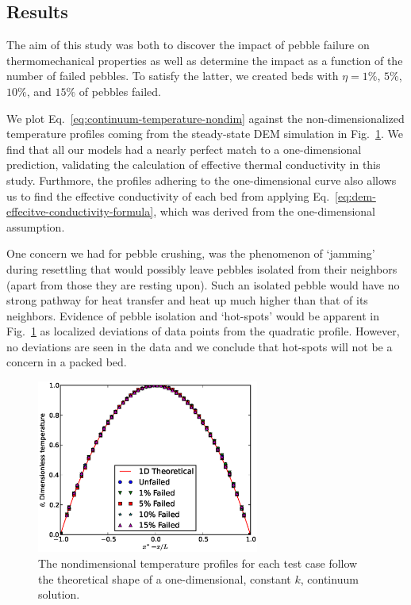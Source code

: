 

\subsection{Results}
The aim of this study was both to discover the impact of pebble failure on thermomechanical properties as well as determine the impact as a function of the number of failed pebbles. To satisfy the latter, we created beds with $\eta = 1\%$, $5\%$, $10\%$, and $15\%$ of pebbles failed. 

We plot Eq.~\ref{eq:continuum-temperature-nondim} against the non-dimensionalized temperature profiles coming from the steady-state DEM simulation in Fig.~\ref{fig:tempProfile}. We find that all our models had a nearly perfect match to a one-dimensional prediction, validating the calculation of effective thermal conductivity in this study. Furthmore, the profiles adhering to the one-dimensional curve also allows us to find the effective conductivity of each bed from applying Eq.~\ref{eq:dem-effecitve-conductivity-formula}, which was derived from the one-dimensional assumption.

One concern we had for pebble crushing, was the phenomenon of `jamming' during resettling that would possibly leave pebbles isolated from their neighbors (apart from those they are resting upon). Such an isolated pebble would have no strong pathway for heat transfer and heat up much higher than that of its neighbors. Evidence of pebble isolation and `hot-spots' would be apparent in Fig.~\ref{fig:tempProfile} as localized deviations of data points from the quadratic profile. However, no deviations are seen in the data and we conclude that hot-spots will not be a concern in a packed bed.

\begin{figure}[htbp]
	\centering
	\includegraphics[width=0.65\textwidth]{chapters/figures/tempProfiles}
	\caption{The nondimensional temperature profiles for each test case follow the theoretical shape of a one-dimensional, constant $k$, continuum solution.}
\label{fig:tempProfile}
\end{figure}

